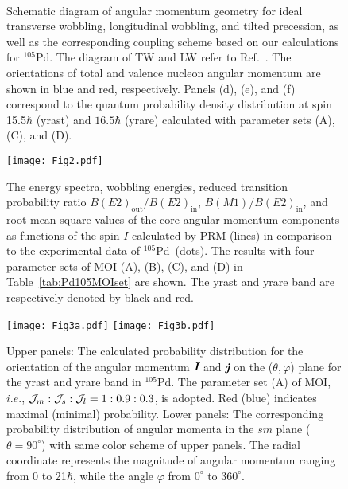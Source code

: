 \documentclass[aps,prc,preprint,showpacs,groupedaddress,floatfix,amsmath,amssymb]{revtex4-1}
\begin{document}
\begin{figure}[ht!]
\centering
{}
\\
\caption{\label{fig:picture} Schematic diagram of angular momentum geometry for ideal transverse wobbling, longitudinal wobbling, and tilted precession, as well as the corresponding coupling scheme based on our calculations for $^{105}$Pd. The diagram of TW and LW refer to Ref.~\cite{Au187}.
The orientations of total and valence nucleon angular momentum are shown in blue and red, respectively.
Panels (d), (e), and (f) correspond to the quantum probability density distribution  at spin 15.5$\hbar$ (yrast)  and $16.5\hbar$ (yrare) calculated with  parameter sets (A), (C), and (D).
}
\end{figure}


\begin{figure}[ht!]
  \centering
\texttt{[image: Fig2.pdf]}
\caption{\label{fig:reproduce}
The  energy spectra, wobbling energies, reduced transition probability ratio $B(E2)_{\textrm{out}}/B(E2)_{\textrm{in}}$, $B(M1)/B(E2)_{\textrm{in}}$, and root-mean-square values of the core angular momentum components as functions of the spin $I$ calculated by PRM (lines) in comparison to the experimental data of $^{105}$Pd~\cite{Pd105}(dots). The results with four parameter sets of MOI (A), (B), (C), and (D) in Table~\ref{tab:Pd105MOIset} are shown. The yrast and yrare band are respectively denoted by black and red.
}
\end{figure}


\begin{figure}[ht!]
  \centering
\texttt{[image: Fig3a.pdf]}
\texttt{[image: Fig3b.pdf]}
\caption{\label{fig:Aplota}
Upper panels: The calculated probability distribution for the orientation of the angular momentum $\textit{\textbf{I}}$ and $\textit{\textbf{j}}$ on the ($\theta,\varphi$) plane for the yrast  and  yrare band in $^{105}$Pd. The parameter set (A) of MOI, $i.e.$, ${\cal J}_m:{\cal J}_s:{\cal J}_l=1:0.9:0.3$, is adopted. Red (blue) indicates maximal (minimal) probability.
Lower panels: The corresponding probability distribution of angular momenta in the $sm$ plane ($\theta=90^{\circ}$) with same color scheme of upper panels. The radial coordinate represents the magnitude of angular momentum ranging from 0 to 21$\hbar$, while the angle $\varphi$ from $0^{\circ}$ to $360^{\circ}$.}
\end{figure}
\end{document}
